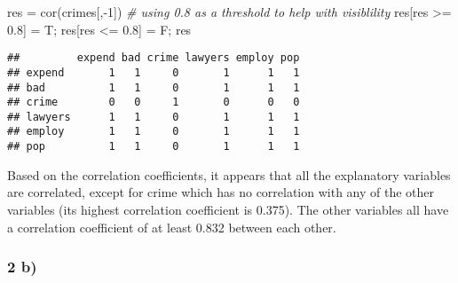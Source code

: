 \documentclass[
  11pt,
]{article}
\newenvironment{Shaded}{\begin{snugshade}}{\end{snugshade}}
\newcommand{\AttributeTok}[1]{\textcolor[rgb]{0.77,0.63,0.00}{#1}}
\newcommand{\CommentTok}[1]{\textcolor[rgb]{0.56,0.35,0.01}{\textit{#1}}}
\newcommand{\ControlFlowTok}[1]{\textcolor[rgb]{0.13,0.29,0.53}{\textbf{#1}}}
\newcommand{\DecValTok}[1]{\textcolor[rgb]{0.00,0.00,0.81}{#1}}
\newcommand{\FloatTok}[1]{\textcolor[rgb]{0.00,0.00,0.81}{#1}}
\newcommand{\FunctionTok}[1]{\textcolor[rgb]{0.00,0.00,0.00}{#1}}
\newcommand{\NormalTok}[1]{#1}
\newcommand{\OtherTok}[1]{\textcolor[rgb]{0.56,0.35,0.01}{#1}}
\newcommand{\SpecialCharTok}[1]{\textcolor[rgb]{0.00,0.00,0.00}{#1}}
\newcommand{\StringTok}[1]{\textcolor[rgb]{0.31,0.60,0.02}{#1}}
\begin{document}
\begin{Shaded}
\begin{Highlighting}[]
\NormalTok{res }\OtherTok{=} \FunctionTok{cor}\NormalTok{(crimes[,}\SpecialCharTok{{-}}\DecValTok{1}\NormalTok{])}
\CommentTok{\# using 0.8 as a threshold to help with visiblility}
\NormalTok{res[res }\SpecialCharTok{\textgreater{}=} \FloatTok{0.8}\NormalTok{] }\OtherTok{=}\NormalTok{ T; res[res }\SpecialCharTok{\textless{}=} \FloatTok{0.8}\NormalTok{] }\OtherTok{=}\NormalTok{ F; }
\NormalTok{res}
\end{Highlighting}
\end{Shaded}

\begin{verbatim}
##         expend bad crime lawyers employ pop
## expend       1   1     0       1      1   1
## bad          1   1     0       1      1   1
## crime        0   0     1       0      0   0
## lawyers      1   1     0       1      1   1
## employ       1   1     0       1      1   1
## pop          1   1     0       1      1   1
\end{verbatim}

Based on the correlation coefficients, it appears that all the
explanatory variables are correlated, except for crime which has no
correlation with any of the other variables (its highest correlation
coefficient is 0.375). The other variables all have a correlation
coefficient of at least 0.832 between each other.

\hypertarget{b-1}{%
\subsubsection{2 b)}\label{b-1}}

\begin{Shaded}
\end{Shaded}
\end{document}
